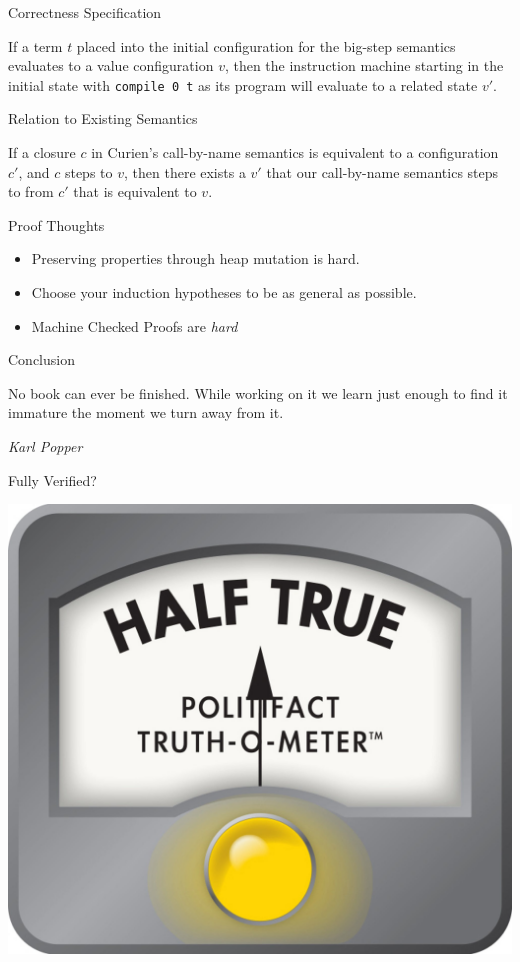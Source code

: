 \documentclass[14pt,mathserif]{beamer}
\newcommand{\sectionslide}[3]{
  \begin{frame}
  \vspace{1cm}
  \vfill
  {\usebeamerfont{title} \color{red} #1}
  \vfill
  \epigraph{\footnotesize{#2}}{\footnotesize{\emph{#3}}}
  \end{frame}}
\begin{document}
\begin{frame}{Correctness Specification}
\begin{theorem} 
If a term $t$ placed into the initial configuration for the big-step semantics
evaluates to a value configuration $v$, then the instruction machine starting
in the initial state with \texttt{compile 0 t} as its program will evaluate to a
related state $v'$.  
\end{theorem}
\end{frame}

\begin{frame}{Relation to Existing Semantics}
\begin{theorem}
If a closure $c$ in Curien's call-by-name semantics is equivalent to a
configuration $c'$, and $c$ steps to $v$, then there exists a $v'$ that our
call-by-name semantics steps to from $c'$ that is equivalent to $v$.
\end{theorem}
\end{frame}

\begin{frame}{Proof Thoughts}
\begin{itemize}
\item Preserving properties through heap mutation is hard.
\item Choose your induction hypotheses to be as general as possible.
\item Machine Checked Proofs are \emph{hard}
\end{itemize}
\end{frame}

\sectionslide{Conclusion}
{No book can ever be finished. While working on it we learn just enough to find
it immature the moment we turn away from it.}
{Karl Popper}

\begin{frame}[fragile]{Fully Verified?}
\begin{center}
\includegraphics[width=0.6\linewidth]{half-true}
\end{center}
\end{frame}
\end{document}
